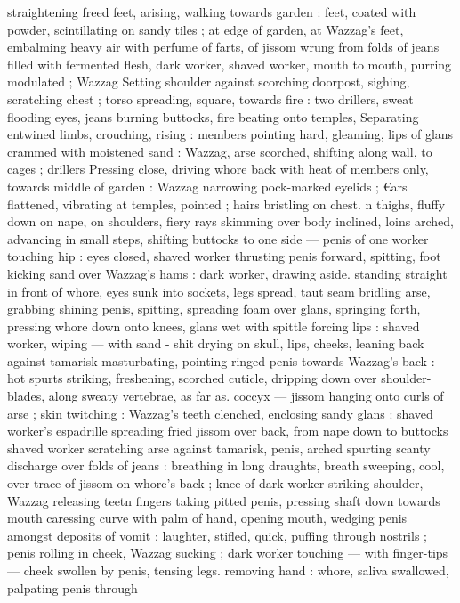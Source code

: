straightening freed feet, arising, walking towards garden : feet,
coated with powder, scintillating on sandy tiles ; at edge of garden,
at Wazzag's feet, embalming heavy air with perfume of farts, of
jissom wrung from folds of jeans filled with fermented flesh, dark
worker, shaved worker, mouth to mouth, purring modulated ; Wazzag
Setting shoulder against scorching doorpost, sighing, scratching
chest ; torso spreading, square, towards fire : two drillers, sweat
flooding eyes, jeans burning buttocks, fire beating onto temples,
Separating entwined limbs, crouching, rising : members pointing
hard, gleaming, lips of glans crammed with moistened sand :
Wazzag, arse scorched, shifting along wall, to cages ; drillers
Pressing close, driving whore back with heat of members only,
towards middle of garden : Wazzag narrowing pock-marked eyelids ;
€ars flattened, vibrating at temples, pointed ; hairs bristling on chest.
n thighs, fluffy down on nape, on shoulders, fiery rays skimming
over body inclined, loins arched, advancing in small steps, shifting
buttocks to one side --- penis of one worker touching hip : eyes
closed, shaved worker thrusting penis forward, spitting, foot kicking
sand over Wazzag's hams : dark worker, drawing aside. standing
straight in front of whore, eyes sunk into sockets, legs spread, taut
seam bridling arse, grabbing shining penis, spitting, spreading foam
over glans, springing forth, pressing whore down onto knees, glans
wet with spittle forcing lips : shaved worker, wiping --- with sand -
shit drying on skull, lips, cheeks, leaning back against tamarisk
masturbating, pointing ringed penis towards Wazzag's back : hot
spurts striking, freshening, scorched cuticle, dripping down over
shoulder-blades, along sweaty vertebrae, as far as. coccyx --- jissom
hanging onto curls of arse ; skin twitching : Wazzag's teeth
clenched, enclosing sandy glans : shaved worker's espadrille
spreading fried jissom over back, from nape down to buttocks
shaved worker scratching arse against tamarisk, penis, arched
spurting scanty discharge over folds of jeans : breathing in long
draughts, breath sweeping, cool, over trace of jissom on whore’s
back ; knee of dark worker striking shoulder, Wazzag releasing teetn
fingers taking pitted penis, pressing shaft down towards mouth
caressing curve with palm of hand, opening mouth, wedging penis
amongst deposits of vomit : laughter, stifled, quick, puffing through
nostrils ; penis rolling in cheek, Wazzag sucking ; dark worker
touching --- with finger-tips --- cheek swollen by penis, tensing legs.
removing hand : whore, saliva swallowed, palpating penis through
